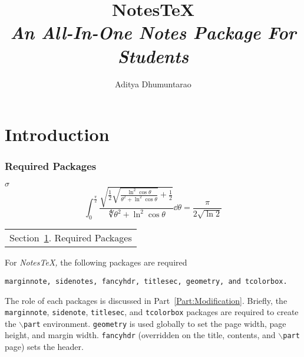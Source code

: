 \documentclass[10pt]{article}
\begin{document}
	\title{{Notes\TeX}\\{\normalsize{\itshape An All-In-One Notes Package For Students}}}
	\author{Aditya Dhumuntarao}
	\maketitle
	\newpage
	\pagestyle{fancynotes}
	\part{Introduction}

	\section{Required Packages}\label{sec:reqpackages}
	$\sigma$
	\begin{equation}
	\int_0^{\frac{\pi}{2}}
        \frac{\sqrt{\frac12 \sqrt{\frac{\ln^2\cos\theta}{\theta^2+\ln^2\cos\theta}} + \frac12}}%
            {\fourthroot{\theta^2 + \ln^2\cos\theta}} \dd{\theta}
      = \frac{\pi}{2\sqrt{\ln 2}}
	\end{equation}

	\begin{margintable}\vspace{.8in}\footnotesize
		\begin{tabularx}{\marginparwidth}{|X}
		Section~\ref{sec:reqpackages}. Required Packages\\
		\end{tabularx}
	\end{margintable}
	For \textit{NotesTeX,} the following packages are required
	\begin{center}
		\texttt{marginnote, sidenotes, fancyhdr, titlesec, geometry, and tcolorbox.}
	\end{center}
	The role of each packages is discussed in Part~\ref{Part:Modification}. Briefly, the \texttt{marginnote}, \texttt{sidenote}, \texttt{titlesec}, and \texttt{tcolorbox} packages are required to create the \texttt{$\backslash$part} environment. \texttt{geometry} is used globally to set the page width, page height, and margin width. \texttt{fancyhdr} (overridden on the title, contents, and \texttt{$\backslash$part} page) sets the header.
\end{document}
